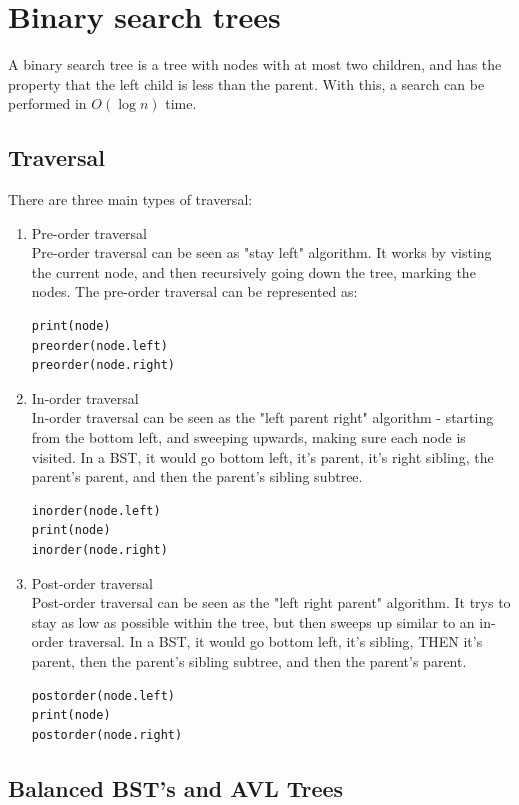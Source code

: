 \documentclass[14]{article}
\begin{document}
\section{Binary search trees}
A binary search tree is a tree with nodes with at most two children, and has the property that the left child is less than the parent.
With this, a search can be performed in $O(\log n)$ time.
\subsection{Traversal}
There are three main types of traversal: 
\begin{enumerate}
	\item Pre-order traversal \\
	Pre-order traversal can be seen as "stay left" algorithm. It works by visting the current node, and then recursively 
	going down the tree, marking the nodes. The pre-order traversal can be represented as:
	\begin{verbatim}
print(node)
preorder(node.left)
preorder(node.right)
	\end{verbatim}
	\item In-order traversal \\
	In-order traversal can be seen as the "left parent right" algorithm - starting from the bottom left, and sweeping upwards,
	making sure each node is visited. In a BST, it would go bottom left, it's parent, it's right sibling, 
	the parent's parent, and then the parent's sibling subtree.
	\begin{verbatim}
inorder(node.left)
print(node)
inorder(node.right)
	\end{verbatim}
	\item Post-order traversal \\
	Post-order traversal can be seen as the "left right parent" algorithm. It trys to stay as low as possible within the tree,
	but then sweeps up similar to an in-order traversal. In a BST, it would go bottom left, it's sibling, THEN it's parent,
	then the parent's sibling subtree, and then the parent's parent.
	\begin{verbatim}
postorder(node.left)
print(node)
postorder(node.right)
	\end{verbatim}
\end{enumerate}
\pagebreak
\subsection{Balanced BST's and AVL Trees}
\end{document}
